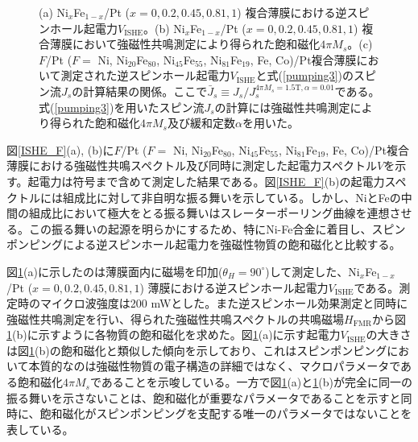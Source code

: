 \begin{figure}[t]
\centerline{
}
\caption{(a) Ni$_x$Fe$_{1-x}$/Pt ($x=0, 0.2, 0.45, 0.81, 1$) 複合薄膜における逆スピンホール起電力$V_\text{ISHE}$。(b) Ni$_x$Fe$_{1-x}$/Pt ($x=0, 0.2, 0.45, 0.81, 1$) 複合薄膜において強磁性共鳴測定により得られた飽和磁化$4\pi M_s$。(c) $F$/Pt ($F=$ Ni, Ni$_{20}$Fe$_{80}$, Ni$_{45}$Fe$_{55}$, Ni$_{81}$Fe$_{19}$, Fe, Co)/Pt複合薄膜において測定された逆スピンホール起電力$V_\text{ISHE}$と式(\ref{pumping3})のスピン流$J_s$の計算結果の関係。ここで$\bar{J}_s\equiv J_s/J_s^{4\pi M_s=1.5 \text{T}, \alpha=0.01}$である。式(\ref{pumping3})を用いたスピン流$J_s$の計算には強磁性共鳴測定により得られた飽和磁化$4\pi M_s$及び緩和定数$\alpha$を用いた。}
\label{satM} 
\end{figure}




図\ref{ISHE_F}(a), (b)に$F$/Pt ($F=$ Ni, Ni$_{20}$Fe$_{80}$, Ni$_{45}$Fe$_{55}$, Ni$_{81}$Fe$_{19}$, Fe, Co)/Pt複合薄膜における強磁性共鳴スペクトル及び同時に測定した起電力スペクトル$V$を示す。起電力は符号まで含めて測定した結果である。図\ref{ISHE_F}(b)の起電力スペクトルには組成比に対して非自明な振る舞いを示している。しかし、NiとFeの中間の組成比において極大をとる振る舞いはスレーターポーリング曲線を連想させる。この振る舞いの起源を明らかにするため、特にNi-Fe合金に着目し、スピンポンピングによる逆スピンホール起電力を強磁性物質の飽和磁化と比較する。

図\ref{satM}(a)に示したのは薄膜面内に磁場を印加($\theta_H=90^\circ$)して測定した、Ni$_x$Fe$_{1-x}$/Pt ($x=0, 0.2, 0.45, 0.81, 1$) 薄膜における逆スピンホール起電力$V_\text{ISHE}$である。測定時のマイクロ波強度は200 mWとした。また逆スピンホール効果測定と同時に強磁性共鳴測定を行い、得られた強磁性共鳴スペクトルの共鳴磁場$H_\text{FMR}$から図\ref{satM}(b)に示すように各物質の飽和磁化を求めた。図\ref{satM}(a)に示す起電力$V_\text{ISHE}$の大きさは図\ref{satM}(b)の飽和磁化と類似した傾向を示しており、これはスピンポンピングにおいて本質的なのは強磁性物質の電子構造の詳細ではなく、マクロパラメータである飽和磁化$4\pi M_s$であることを示唆している。一方で図\ref{satM}(a)と\ref{satM}(b)が完全に同一の振る舞いを示さないことは、飽和磁化が重要なパラメータであることを示すと同時に、飽和磁化がスピンポンピングを支配する唯一のパラメータではないことを表している。

